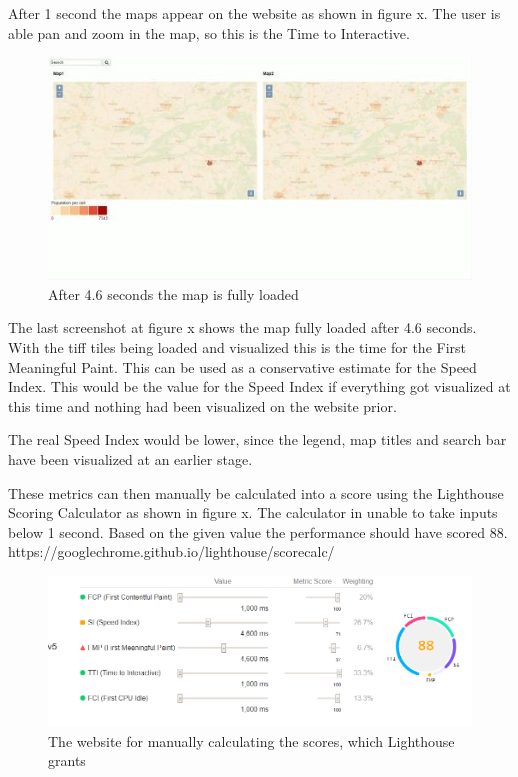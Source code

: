 After 1 second the maps appear on the website as shown in figure x. The user is able pan and zoom in the map, so this is the Time to Interactive. 

\begin{figure} [H]
	\centering
	\includegraphics[width=.8\textwidth]{Pictures/ScreenshotLoading3}
	\caption{After 4.6 seconds the map is fully loaded}
	\label{ScreenshotLoading3}
\end{figure}

The last screenshot at figure x shows the map fully loaded after 4.6 seconds. With the tiff tiles being loaded and visualized this is the time for the First Meaningful Paint. This can be used as a conservative estimate for the Speed Index. This would be the value for the Speed Index if everything got visualized at this time and nothing had been visualized on the website prior.

The real Speed Index would be lower, since the legend, map titles and search bar have been visualized at an earlier stage. 

These metrics can then manually be calculated into a score using the Lighthouse Scoring Calculator as shown in figure x. The calculator in unable to take inputs below 1 second. Based on the given value the performance should have scored 88.
https://googlechrome.github.io/lighthouse/scorecalc/

\begin{figure} [H]
	\centering
	\includegraphics[width=.8\textwidth]{Pictures/ScoringManual}
	\caption{The website for manually calculating the scores, which Lighthouse grants}
	\label{ScoringManual}
\end{figure}

